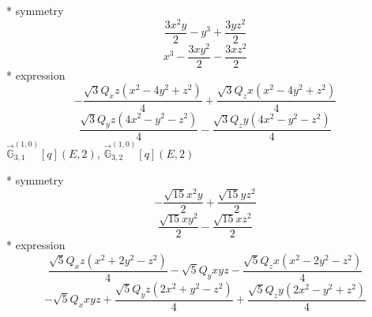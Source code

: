 \documentclass[fleqn,8pt]{jsarticle}
\begin{document}
\noindent\quad ** symmetry
\begin{dmath*}
\frac{3 x^{2} y}{2} - y^{3} + \frac{3 y z^{2}}{2}
\end{dmath*}
\begin{dmath*}
x^{3} - \frac{3 x y^{2}}{2} - \frac{3 x z^{2}}{2}
\end{dmath*}
\noindent\quad ** expression
\begin{dmath*}
- \frac{\sqrt{3} Q_{x} z \left(x^{2} - 4 y^{2} + z^{2}\right)}{4} + \frac{\sqrt{3} Q_{z} x \left(x^{2} - 4 y^{2} + z^{2}\right)}{4}
\end{dmath*}
\begin{dmath*}
\frac{\sqrt{3} Q_{y} z \left(4 x^{2} - y^{2} - z^{2}\right)}{4} - \frac{\sqrt{3} Q_{z} y \left(4 x^{2} - y^{2} - z^{2}\right)}{4}
\end{dmath*}
\noindent\quad $\vec{\mathbb{G}}_{3,1}^{(1,0)}[q](E,2)$, $\vec{\mathbb{G}}_{3,2}^{(1,0)}[q](E,2)$

\noindent\quad ** symmetry
\begin{dmath*}
- \frac{\sqrt{15} x^{2} y}{2} + \frac{\sqrt{15} y z^{2}}{2}
\end{dmath*}
\begin{dmath*}
\frac{\sqrt{15} x y^{2}}{2} - \frac{\sqrt{15} x z^{2}}{2}
\end{dmath*}
\noindent\quad ** expression
\begin{dmath*}
\frac{\sqrt{5} Q_{x} z \left(x^{2} + 2 y^{2} - z^{2}\right)}{4} - \sqrt{5} Q_{y} x y z - \frac{\sqrt{5} Q_{z} x \left(x^{2} - 2 y^{2} - z^{2}\right)}{4}
\end{dmath*}
\begin{dmath*}
- \sqrt{5} Q_{x} x y z + \frac{\sqrt{5} Q_{y} z \left(2 x^{2} + y^{2} - z^{2}\right)}{4} + \frac{\sqrt{5} Q_{z} y \left(2 x^{2} - y^{2} + z^{2}\right)}{4}
\end{dmath*}
\end{document}
